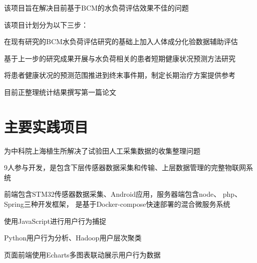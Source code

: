 \documentclass[]{deedy-resume-openfont}
\begin{document}
\begin{minipage}[t]{0.73\textwidth}
	\descript{}
    \begin{tightemize}
        \item 该项目旨在解决目前基于BCM的水负荷评估效果不佳的问题
        \item 该项目计划分为以下三步：
        \vspace{\topsep}
        \begin{tightemize}
            \item 在现有研究的BCM水负荷评估研究的基础上加入人体成分化验数据辅助评估
            \item 基于上一步的研究成果开展与水负荷相关的患者短期健康状况预测方法研究
            \item 将患者健康状况的预测范围推进到终末事件期，制定长期治疗方案提供参考
        \end{tightemize}
        \vspace{\topsep}
		\item 目前正整理统计结果撰写第一篇论文
	\end{tightemize}
    \sectionsep

    \section{主要实践项目}
	\begin{tightemize}
		\item 为中科院上海植生所解决了试验田人工采集数据的收集整理问题
		\item 9人参与开发，是包含下层传感器数据采集和传输、上层数据管理的完整物联网系统
		\item 前端包含STM32传感器数据采集、Android应用，服务器端包含node、 php、 Spring三种开发框架， 是基于Docker-compose快速部署的混合微服务系统
	\end{tightemize}
	\sectionsep

	\begin{tightemize}
		\item 使用JavaScript进行用户行为捕捉
		\item Python用户行为分析、Hadoop用户层次聚类
		\item 页面前端使用Echarts多图表联动展示用户行为数据
	\end{tightemize}
    \sectionsep
    

\end{minipage}
\end{document}
